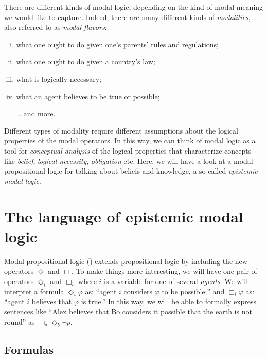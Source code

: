 \documentclass[nobib,nofonts]{tufte-handout}
\newcommand{\modlog}{\acro{ModLog}}
\begin{document}
There are different kinds of modal logic, depending on the kind of modal meaning we would like to capture.
Indeed, there are many different kinds of \emph{modalities}, also referred to as \emph{modal flavors}:
\begin{enumerate}[(i)]
  \item what one ought to do given one's parents' rules and regulations;
  \item what one ought to do given a country's law;
  \item what is logically necessary;
  \item what an agent believes to be true or possible;
  \item[\dots] and more.
\end{enumerate}
Different types of modality require different assumptions about the logical properties of the modal operators.
In this way, we can think of modal logic as a tool for \emph{conceptual analysis} of the logical properties that characterize concepts like \emph{belief}, \emph{logical necessity}, \emph{obligation} etc.
Here, we will have a look at a modal propositional logic for talking about beliefs and knowledge, a so-called \emph{epistemic modal logic}.

\section{The language of epistemic modal logic}

Modal propositional logic (\modlog) extends propositional logic by including the new operators $\Diamond$ and $\Box$.
To make things more interesting, we will have one pair of operators $\Diamond_{i}$ and $\Box_{i}$ where $i$ is a variable for one of several \emph{agents}.
We will interpret a formula $\Diamond_{i} \varphi$ as: ``agent $i$ considers $\varphi$ to be possible;''
and $\Box_{i}\varphi$ as: ``agent $i$ believes that $\varphi$ is true.''
In this way, we will be able to formally express sentences like ``Alex believes that Bo considers it possible that the earth is not round'' as $\Box_{a} \Diamond_{b} \neg p$.

\subsection{Formulas}
\end{document}
